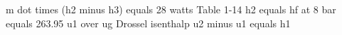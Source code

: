 m dot times (h2 minus h3) equals 28 watts  
Table 1-14  
h2 equals hf at 8 bar equals 263.95 u1 over ug  
Drossel isenthalp  
u2 minus u1 equals h1
